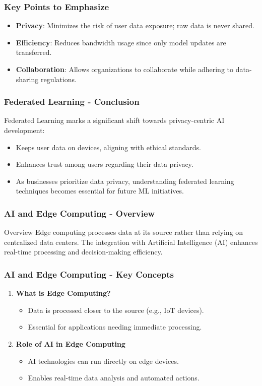 \documentclass{beamer}
\begin{document}
\begin{frame}[fragile]
    \frametitle{Key Points to Emphasize}
    \begin{itemize}
        \item \textbf{Privacy}: Minimizes the risk of user data exposure; raw data is never shared.
        \item \textbf{Efficiency}: Reduces bandwidth usage since only model updates are transferred.
        \item \textbf{Collaboration}: Allows organizations to collaborate while adhering to data-sharing regulations.
    \end{itemize}
\end{frame}

\begin{frame}[fragile]
    \frametitle{Federated Learning - Conclusion}
    Federated Learning marks a significant shift towards privacy-centric AI development:
    
    \begin{itemize}
        \item Keeps user data on devices, aligning with ethical standards.
        \item Enhances trust among users regarding their data privacy.
        \item As businesses prioritize data privacy, understanding federated learning techniques becomes essential for future ML initiatives.
    \end{itemize}
\end{frame}

\begin{frame}
    \frametitle{AI and Edge Computing - Overview}
    \begin{block}{Overview}
        Edge computing processes data at its source rather than relying on centralized data centers. The integration with Artificial Intelligence (AI) enhances real-time processing and decision-making efficiency.
    \end{block}
\end{frame}

\begin{frame}
    \frametitle{AI and Edge Computing - Key Concepts}
    \begin{enumerate}
        \item \textbf{What is Edge Computing?}
            \begin{itemize}
                \item Data is processed closer to the source (e.g., IoT devices).
                \item Essential for applications needing immediate processing.
            \end{itemize}
        \item \textbf{Role of AI in Edge Computing}
            \begin{itemize}
                \item AI technologies can run directly on edge devices.
                \item Enables real-time data analysis and automated actions.
            \end{itemize}
    \end{enumerate}
\end{frame}
\end{document}
